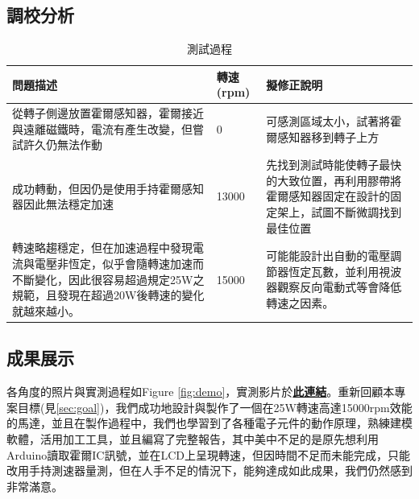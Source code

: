 \documentclass[12pt,a4paper]{article}
\begin{document}
\begin{CJK*}{UTF8}{bkai}
    \subsection{調校分析}
    \begin{table}[H]
        \centering
        \begin{tabularx}{\textwidth}{|X|l|X|}
            \hline
            問題描述                                                                         & 轉速(rpm) & 擬修正說明                                                \\
            \hline
            從轉子側邊放置霍爾感知器，霍爾接近與遠離磁鐵時，電流有產生改變，但嘗試許久仍無法作動                                   & 0       & 可感測區域太小，試著將霍爾感知器移到轉子上方                               \\
            \hline
            成功轉動，但因仍是使用手持霍爾感知器因此無法穩定加速                                                   & 13000   & 先找到測試時能使轉子最快的大致位置，再利用膠帶將霍爾感知器固定在設計的固定架上，試圖不斷微調找到最佳位置 \\
            \hline
            轉速略趨穩定，但在加速過程中發現電流與電壓非恆定，似乎會隨轉速加速而不斷變化，因此很容易超過規定25W之規範，且發現在超過20W後轉速的變化就越來越小。 & 15000   & 可能能設計出自動的電壓調節器恆定瓦數，並利用視波器觀察反向電動式等會降低轉速之因素。           \\
            \hline
        \end{tabularx}
        \caption{測試過程}
    \end{table}

    \newpage
    \subsection{成果展示}
    各角度的照片與實測過程如Figure \ref{fig:demo}，實測影片於\href{https://youtu.be/jbmlMec0Nww}{\textbf{此連結}}。重新回顧本專案目標(見\ref{sec:goal})，我們成功地設計與製作了一個在25W轉速高達15000rpm效能的馬達，並且在製作過程中，我們也學習到了各種電子元件的動作原理，熟練建模軟體，活用加工工具，並且編寫了完整報告，其中美中不足的是原先想利用Arduino讀取霍爾IC訊號，並在LCD上呈現轉速，但因時間不足而未能完成，只能改用手持測速器量測，但在人手不足的情況下，能夠達成如此成果，我們仍然感到非常滿意。


\end{CJK*}
\end{document}
